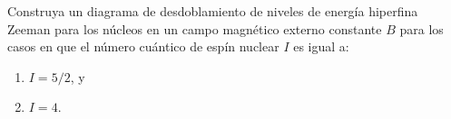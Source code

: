 \item Construya un diagrama de desdoblamiento de niveles de energía hiperfina Zeeman para los núcleos en un campo magnético externo constante $B$ para los casos en que el número cuántico de espín nuclear $I$ es igual a:
\begin{enumerate}
    \item $I = 5/2$, y
    \item $I = 4$.
\end{enumerate}